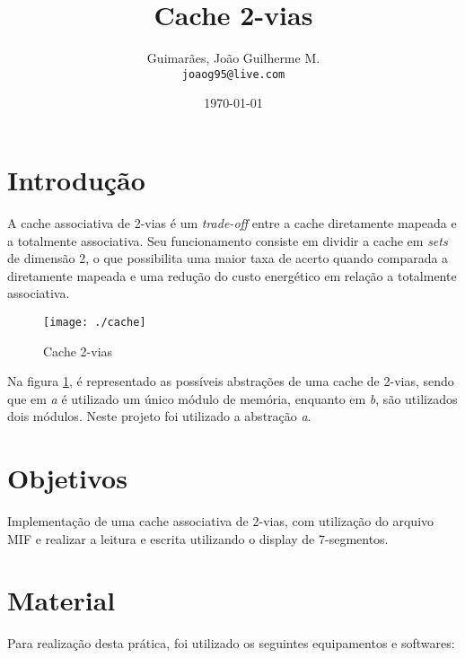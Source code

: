 \documentclass[12pt, a4paper]{article}
\title{\textbf{Cache 2-vias}}
\author{
	Guimarães, João Guilherme M.\\
	\texttt{joaog95@live.com}
}
\date{\today}
\begin{document}
	\maketitle
	
	\vspace{1cm}
	
	\section{Introdução}
	
	\par A cache associativa de 2-vias é um \textit{trade-off} entre a cache diretamente mapeada e a totalmente associativa. Seu funcionamento consiste em dividir a cache em \textit{sets} de dimensão 2, o que possibilita uma maior taxa de acerto quando comparada a diretamente mapeada e uma redução do custo energético em relação a totalmente associativa.

	\vspace{\baselineskip}
	
	\begin{figure}[H]
		\centering
		\texttt{[image: ./cache]}
		\caption{Cache 2-vias}
		\label{fig: cache 2-vias}
	\end{figure}

	\par Na figura \ref{fig: cache 2-vias}, é representado as possíveis abstrações de uma cache de 2-vias, sendo que em \textit{a} é utilizado um único módulo de memória, enquanto em \textit{b}, são utilizados dois módulos. Neste projeto foi utilizado a abstração \textit{a}.

	\section{Objetivos}
	
	\par Implementação de uma cache associativa de 2-vias, com utilização do arquivo MIF e realizar a leitura e escrita utilizando o display de 7-segmentos.
	
	\section{Material}
	
	\par Para realização desta prática, foi utilizado os seguintes equipamentos e softwares:
	
\end{document}
